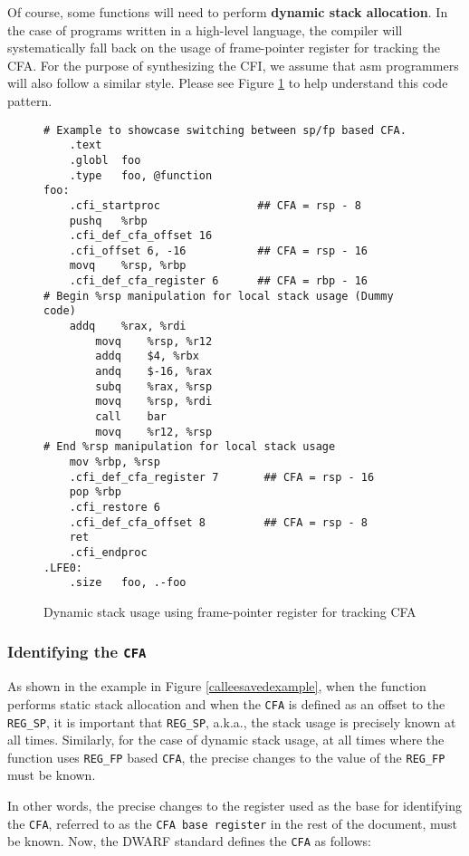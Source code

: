 \documentclass{article} \usepackage[a4paper, total={6in, 8in}]{geometry}
\begin{document}
Of course, some functions will need to perform \textbf{dynamic stack
allocation}. In the case of programs written in a high-level language, the
compiler will systematically fall back on the usage of frame-pointer
register for tracking the CFA.  For the purpose of synthesizing the CFI, we
assume that asm programmers will also follow a similar style.  Please see Figure
\ref{dynamicstackusage} to help understand this code pattern.

\begin{figure}
\caption{Dynamic stack usage using frame-pointer register for tracking CFA}
\label{dynamicstackusage}
\begin{verbatim}
# Example to showcase switching between sp/fp based CFA.
	.text
	.globl	foo
	.type	foo, @function
foo:
	.cfi_startproc               ## CFA = rsp - 8
	pushq	%rbp
	.cfi_def_cfa_offset 16
	.cfi_offset 6, -16           ## CFA = rsp - 16
	movq    %rsp, %rbp
	.cfi_def_cfa_register 6      ## CFA = rbp - 16
# Begin %rsp manipulation for local stack usage (Dummy code)
	addq    %rax, %rdi
        movq    %rsp, %r12
        addq    $4, %rbx
        andq    $-16, %rax
        subq    %rax, %rsp
        movq    %rsp, %rdi
        call    bar
        movq    %r12, %rsp
# End %rsp manipulation for local stack usage
	mov	%rbp, %rsp
	.cfi_def_cfa_register 7       ## CFA = rsp - 16
	pop	%rbp
	.cfi_restore 6
	.cfi_def_cfa_offset 8         ## CFA = rsp - 8
	ret
	.cfi_endproc
.LFE0:
	.size	foo, .-foo
\end{verbatim}
\end{figure}

\subsubsection{Identifying the \texttt{CFA}}
\label{identifyingtheCFA}
As shown in the example in Figure \ref{calleesavedexample}, when the function
performs static stack allocation and when the \texttt{CFA} is defined as an
offset to the \texttt{REG\_SP}, it is important that \texttt{REG\_SP}, a.k.a.,
the stack usage is precisely known at all times.  Similarly, for the
case of dynamic stack usage, at all times where the function uses
\texttt{REG\_FP} based \texttt{CFA}, the precise changes to the value of
the \texttt{REG\_FP} must be known.

In other words, the precise changes to the register used as the base for
identifying the \texttt{CFA}, referred to as the \texttt{CFA base register} in
the rest of the document, must be known.  Now, the DWARF standard\cite{DWARF5} defines the
\texttt{CFA} as follows:
\end{document}
